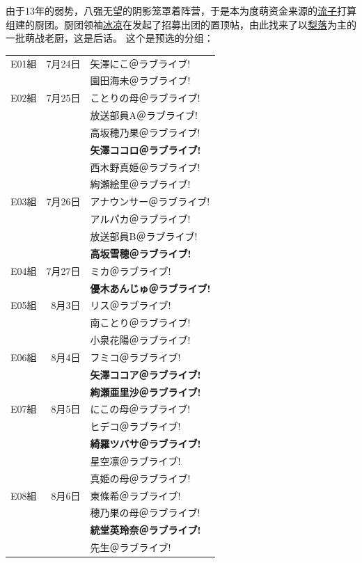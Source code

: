 由于13年的弱势，八强无望的阴影笼罩着阵营，于是本为度萌资金来源的\uline{流子}打算组建的厨团。厨团领袖\uline{冰凉}在发起了招募出团的置顶帖，由此找来了以\uline{梨落}为主的一批萌战老厨，这是后话。
这个是预选的分组：

\def\iD{\mincho}
\def\iA{\minchob}
\def\iB{\mincho\bfseries}
{\mincho{}
\begin{longtable}{|rrl|}\hline
E01組 & 7月24日 & \iA 矢澤にこ＠ラブライブ!\\
 & & \iA 園田海未＠ラブライブ!\\\hline
E02組 & 7月25日 & \iD ことりの母＠ラブライブ!\\
 & & \iD 放送部員A＠ラブライブ!\\
 & & \iA 高坂穂乃果＠ラブライブ!\\
 & & \iB 矢澤ココロ＠ラブライブ!\\
 & & \iA 西木野真姫＠ラブライブ!\\
 & & \iA 絢瀬絵里＠ラブライブ!\\\hline
E03組 & 7月26日 & \iD アナウンサー＠ラブライブ!\\
 & & \iD アルパカ＠ラブライブ!\\
 & & \iD 放送部員B＠ラブライブ!\\
 & & \iB 高坂雪穂＠ラブライブ!\\\hline
E04組 & 7月27日 & \iD ミカ＠ラブライブ!\\
 & & \iB 優木あんじゅ＠ラブライブ!\\\hline
E05組 & 8月3日 & \iD リス＠ラブライブ!\\
 & & \iA 南ことり＠ラブライブ!\\
 & & \iA 小泉花陽＠ラブライブ!\\\hline
E06組 & 8月4日 & \iD フミコ＠ラブライブ!\\
 & & \iB 矢澤ココア＠ラブライブ!\\
 & & \iB 絢瀬亜里沙＠ラブライブ!\\\hline
E07組 & 8月5日 & \iD にこの母＠ラブライブ!\\
 & & \iD ヒデコ＠ラブライブ!\\
 & & \iB 綺羅ツバサ＠ラブライブ!\\
 & & \iA 星空凛＠ラブライブ!\\
 & & \iD 真姫の母＠ラブライブ!\\\hline
E08組 & 8月6日 & \iA 東條希＠ラブライブ!\\
 & & \iD 穂乃果の母＠ラブライブ!\\
 & & \iB 統堂英玲奈＠ラブライブ!\\
 & & \iD 先生＠ラブライブ!\\\hline
\end{longtable}}


